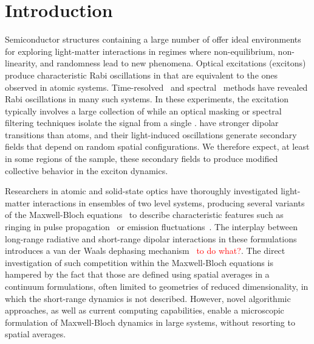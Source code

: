 \section{\label{section:introduction}Introduction}
Semiconductor structures containing a large number of \qds{} offer ideal environments for exploring light-matter interactions in regimes where non-equilibrium, non-linearity, and randomness lead to new phenomena.
Optical excitations (excitons) produce characteristic Rabi oscillations in \qds{} that are equivalent to the ones observed in atomic systems.
Time-resolved~\cite{Stievater2001,PhysRevLett.88.087401} and spectral~\cite{PhysRevLett.87.246401} methods have revealed Rabi oscillations in many such systems.
In these experiments, the excitation typically involves a large collection of \qds{} while an optical masking or spectral filtering techniques isolate the signal from a single \qd{}.
\Qds{} have stronger dipolar transitions than atoms, and their light-induced oscillations generate secondary fields that depend on random spatial configurations.
We therefore expect, at least in some regions of the sample, these secondary fields to produce modified collective behavior in the exciton dynamics.

Researchers in atomic and solid-state optics have thoroughly investigated light-matter interactions in ensembles of two level systems, producing several variants of the Maxwell-Bloch equations~\cite{Gross1982} to describe characteristic features such as ringing in pulse propagation~\cite{Burnham1969,MacGillivray1976} or emission fluctuations~\cite{Haake1979}.
The interplay between long-range radiative and short-range dipolar interactions in these formulations introduces a van der Waals dephasing mechanism~\cite{Coffey1978} \textcolor{red}{to do what?}.
The direct investigation of such competition within the Maxwell-Bloch equations is hampered by the fact that those are defined using spatial averages in a continuum formulations, often limited to geometries of reduced dimensionality, in which the short-range dynamics is not described.
However, novel algorithmic approaches, as well as current computing capabilities, enable a microscopic formulation of Maxwell-Bloch dynamics in large systems, without resorting to spatial averages.

